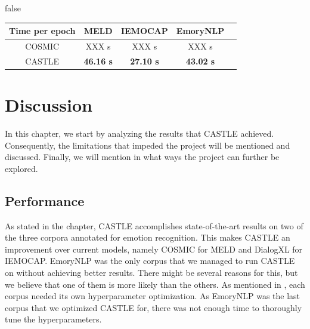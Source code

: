 \documentclass[nofilelist]{cslthse-msc}
\begin{document}



\ifx false
\begin{table}[h!]
\begin{tabular}{|c|c|c|c|c|}
\hline
Time per epoch & MELD             & IEMOCAP          & EmoryNLP          \\ \hline
COSMIC         & XXX s            & XXX s          & XXX s                  \\ \hline
CASTLE         & \textbf{46.16 s} & \textbf{27.10 s} & \textbf{43.02 s}       \\ \hline
\end{tabular}
\end{table}
\fi





\chapter{Discussion}
In this chapter, we start by analyzing the results that CASTLE achieved. Consequently, the limitations that impeded the project will be mentioned and discussed. Finally, we will mention in what ways the project can further be explored. 






\section{Performance}

As stated in the  chapter, CASTLE accomplishes state-of-the-art results on two of the three corpora annotated for emotion recognition. This makes CASTLE an improvement over current models, namely COSMIC for MELD and DialogXL for IEMOCAP. EmoryNLP was the only corpus that we managed to run CASTLE on without achieving better results. There might be several reasons for this, but we believe that one of them is more likely than the others. As mentioned in , each corpus needed its own hyperparameter optimization.
As EmoryNLP was the last corpus that we optimized CASTLE for, there was not enough time to thoroughly tune the hyperparameters.
\end{document}
